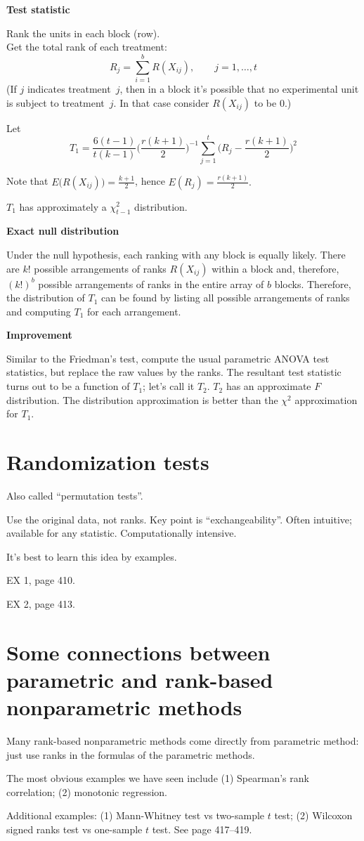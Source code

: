 \documentclass[12pt]{article}
\begin{document}
\textbf{Test statistic}

Rank the units in each block (\ie row).\\
Get the total rank of each treatment:
\[
R_j = \sum_{i=1}^b R(X_{ij})
,\qquad
j=1,\dotsc,t
\]
(If $j$ indicates treatment~$j$, then in a block it's possible that
no experimental unit is subject to treatment~$j$.
In that case consider $R(X_{ij})$ to be 0.)

Let
\[
T_1 = \frac{6(t-1)}{t(k-1)} \biggl(\frac{r(k+1)}{2}\biggr)^{-1}
        \sum_{j=1}^t \biggl(R_j - \frac{r(k+1)}{2}\biggr)^2
\]

Note that
$E\bigl(R(X_{ij})\bigr) = \frac{k+1}{2}$, hence
$E(R_j) = \frac{r(k+1)}{2}.$

$T_1$ has approximately a $\chi^2_{t-1}$ distribution.

\textbf{Exact null distribution}

Under the null hypothesis,
each ranking with any block is equally likely.
There are $k!$ possible arrangements of ranks $R(X_{ij})$ within a block
and, therefore, $(k!)^{b}$ possible arrangements of ranks in the entire
array of $b$ blocks.
Therefore, the distribution of $T_1$ can be found by listing all
possible arrangements of ranks and computing $T_1$ for each arrangement.

\textbf{Improvement}

Similar to the Friedman's test,
compute the usual parametric ANOVA test statistics,
but replace the raw values by the ranks.
The resultant test statistic turns out to be a function of $T_1$;
let's call it $T_2$.
$T_2$ has an approximate $F$ distribution.
The distribution approximation is better than the $\chi^2$ approximation
for $T_1$.


\section{Randomization tests}

Also called ``permutation tests''.

Use the original data, not ranks. Key point is ``exchangeability''.
Often intuitive; available for any statistic.
Computationally intensive.

It's best to learn this idea by examples.

\example EX 1, page 410.

\example EX 2, page 413.

\section{Some connections between parametric and rank-based
nonparametric methods}

Many rank-based nonparametric methods come directly from parametric
method: just use ranks in the formulas of the parametric methods.

The most obvious examples we have seen include
(1) Spearman's rank correlation; (2) monotonic regression.

Additional examples:
(1) Mann-Whitney test vs two-sample $t$ test;
(2) Wilcoxon signed ranks test vs one-sample $t$ test.
See page 417--419.
\end{document}

